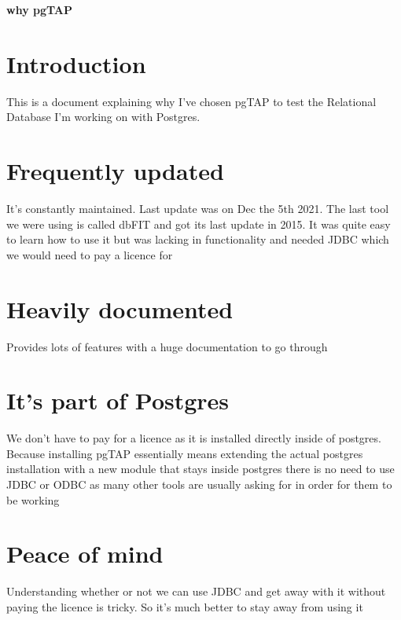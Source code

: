 \documentclass[a4paper,12pt]{article}
\begin{document}
\textbf{why pgTAP}
\tableofcontents

\section{Introduction}

This is a document explaining why I've chosen pgTAP to test the Relational Database I'm working on with Postgres.

\section{Frequently updated}
It's constantly maintained. Last update was on Dec the 5th 2021. The last tool we were using is called dbFIT and got its last update in 2015. It was quite easy to learn how to use it but was lacking in functionality and needed JDBC which we would need to pay a licence for

\section{Heavily documented}
Provides lots of features with a huge documentation to go through

\section{It's part of Postgres}
We don't have to pay for a licence as it is installed directly inside of postgres. Because installing pgTAP essentially means extending the actual postgres installation with a new module that stays inside postgres there is no need to use JDBC or ODBC as many other tools are usually asking for in order for them to be working


\section{Peace of mind}
Understanding whether or not we can use JDBC and get away with it without paying the licence is tricky. So it's much better to stay away from using it


\printindex
\end{document}
